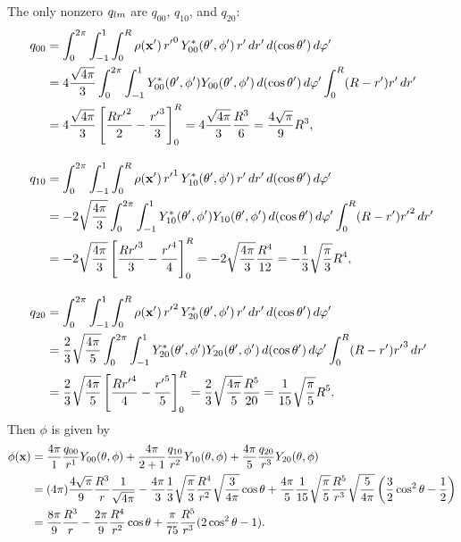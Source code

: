 \begin{solution}
	The only nonzero $q_{l m}$ are $q_{0 0}$, $q_{1 0}$, and $q_{2 0}$:
	\begin{align*}
		q_{0 0} &= \int_0^{2\pi} \int_{-1}^1 \int_0^R \rho(\mathbf{x}') \, {r'}^0 \, Y_{0 0}^*(\theta', \phi') \, r' \dd{r'} \dd{(\cos\theta')} \dd{\varphi'} \\
		&= 4 \frac{\sqrt{4\pi}}{3} \int_0^{2\pi} \int_{-1}^1 Y_{0 0}^*(\theta', \phi') Y_{0 0} (\theta', \phi') \dd{(\cos\theta')} \dd{\varphi'} \int_0^R (R - r') r' \dd{r'} \\
		&= 4 \frac{\sqrt{4\pi}}{3} \left[ \frac{R {r'}^2}{2} - \frac{{r'}^3}{3} \right]_0^R
		= 4 \frac{\sqrt{4\pi}}{3} \frac{R^3}{6}
		= \frac{4 \sqrt{\pi}}{9} R^3, \\[1em]
		q_{1 0} &= \int_0^{2\pi} \int_{-1}^1 \int_0^R \rho(\mathbf{x}') \, {r'}^1 \, Y_{1 0}^*(\theta', \phi') \, r' \dd{r'} \dd{(\cos\theta')} \dd{\varphi'} \\
		&= -2 \sqrt{\frac{4\pi}{3}} \int_0^{2\pi} \int_{-1}^1 Y_{1 0}^*(\theta', \phi') Y_{1 0} (\theta', \phi') \dd{(\cos\theta')} \dd{\varphi'} \int_0^R (R - r') {r'}^2 \dd{r'} \\
		&= -2 \sqrt{\frac{4\pi}{3}} \left[\frac{R {r'}^3}{3} - \frac{{r'}^4}{4} \right]_0^R
		= -2 \sqrt{\frac{4\pi}{3}} \frac{R^4}{12}
		= -\frac{1}{3} \sqrt{\frac{\pi}{3}} R^4, \\[1em]
		q_{2 0} &= \int_0^{2\pi} \int_{-1}^1 \int_0^R \rho(\mathbf{x}') \, {r'}^2 \, Y_{2 0}^*(\theta', \phi') \, r' \dd{r'} \dd{(\cos\theta')} \dd{\varphi'} \\
		&= \frac{2}{3} \sqrt{\frac{4\pi}{5}} \int_0^{2\pi} \int_{-1}^1 Y_{2 0}^*(\theta', \phi') Y_{2 0} (\theta', \phi') \dd{(\cos\theta')} \dd{\varphi'} \int_0^R (R - r') {r'}^3 \dd{r'} \\
		&= \frac{2}{3} \sqrt{\frac{4\pi}{5}} \left[ \frac{R {r'}^4}{4} - \frac{{r'}^5}{5} \right]_0^R
		= \frac{2}{3} \sqrt{\frac{4\pi}{5}} \frac{R^5}{20}
		= \frac{1}{15} \sqrt{\frac{\pi}{5}} R^5.
	\end{align*}
	Then $\phi$ is given by
	\begin{align*}
		\phi(\mathbf{x}) &= \frac{4\pi}{1} \frac{q_{0 0}}{r^1} Y_{0 0}(\theta, \phi) + \frac{4\pi}{2 + 1} \frac{q_{1 0}}{r^2} Y_{1 0}(\theta, \phi) + \frac{4\pi}{5} \frac{q_{2 0}}{r^3} Y_{2 0}(\theta, \phi) \\
		&= (4\pi) \frac{4 \sqrt{\pi}}{9} \frac{R^3}{r} \frac{1}{\sqrt{4 \pi}} - \frac{4\pi}{3} \frac{1}{3} \sqrt{\frac{\pi}{3}} \frac{R^4}{r^2} \sqrt{\frac{3}{4\pi}} \cos\theta + \frac{4\pi}{5} \frac{1}{15} \sqrt{\frac{\pi}{5}} \frac{R^5}{r^3} \sqrt{\frac{5}{4\pi}} \left( \frac{3}{2} \cos^2\theta - \frac{1}{2} \right) \\
		&= \frac{8\pi}{9} \frac{R^3}{r} - \frac{2 \pi}{9} \frac{R^4}{r^2} \cos\theta + \frac{\pi}{75} \frac{R^5}{r^3} (2 \cos^2\theta - 1).
	\end{align*}
\end{solution}
\vfix
